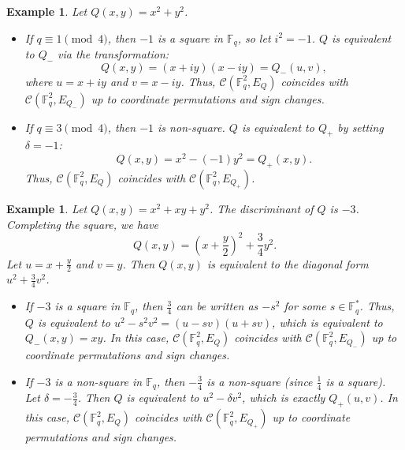 \documentclass{amsart}
\newtheorem{example}[theorem]{Example}
\numberwithin{equation}{section}
\begin{document}
\begin{example}
Let $Q(x, y)=x^2+y^2$.
\begin{itemize}
    \item If $q \equiv 1 \pmod{4}$, then $-1$ is a square in $\mathbb{F}_q$, so let $i^2=-1$. $Q$ is equivalent to $Q_{-}$ via the transformation:
$$
Q(x, y)=(x+iy)(x-iy)=Q_-(u,v),
$$
where $u=x+iy$ and $v=x-iy$.
    Thus, $\mathcal{C}(\mathbb{F}_q^2, E_Q)$ coincides with $\mathcal{C}(\mathbb{F}_q^2, E_{Q_-})$ up to coordinate permutations and sign changes.
    \item If $q \equiv 3 \pmod{4}$, then $-1$ is non-square. $Q$ is equivalent to $Q_{+}$ by setting $\delta = -1$:
$$
Q(x, y)=x^2-(-1)y^2=Q_+(x,y).
$$
Thus, $\mathcal{C}(\mathbb{F}_q^2, E_Q)$ coincides with $\mathcal{C}(\mathbb{F}_q^2, E_{Q_+})$.
\end{itemize}
\end{example}


\begin{example}
Let $Q(x, y) = x^2+xy+y^2$. The discriminant of $Q$ is $-3$.
Completing the square, we have
\[
Q(x, y) = \left(x + \frac{y}{2}\right)^2 + \frac{3}{4}y^2.
\]
Let $u = x + \frac{y}{2}$ and $v = y$. Then $Q(x,y)$ is equivalent to the diagonal form $u^2 + \frac{3}{4}v^2$.

\begin{itemize}
    \item If $-3$ is a square in $\mathbb{F}_q$, then 
    $\frac{3}{4}$ can be written as $-s^2$ for some $s \in \mathbb{F}_q^*$. Thus, $Q$ is equivalent to $u^2 - s^2 v^2 = (u-sv)(u+sv)$, which is equivalent to $Q_-(x, y) = xy$.
    In this case, $\mathcal{C}(\mathbb{F}_q^2, E_Q)$ coincides with $\mathcal{C}(\mathbb{F}_q^2, E_{Q_-})$ up to coordinate permutations and sign changes.

    \item If $-3$ is a non-square in $\mathbb{F}_q$, then %
    $-\frac{3}{4}$ is a non-square (since $\frac{1}{4}$ is a square). Let $\delta = -\frac{3}{4}$. 
    Then $Q$ is equivalent to $u^2 - \delta v^2$, which is exactly $Q_+(u, v)$.
    In this case, $\mathcal{C}(\mathbb{F}_q^2, E_Q)$ coincides with $\mathcal{C}(\mathbb{F}_q^2, E_{Q_+})$ up to coordinate permutations and sign changes.
\end{itemize}
\end{example}
\end{document}
